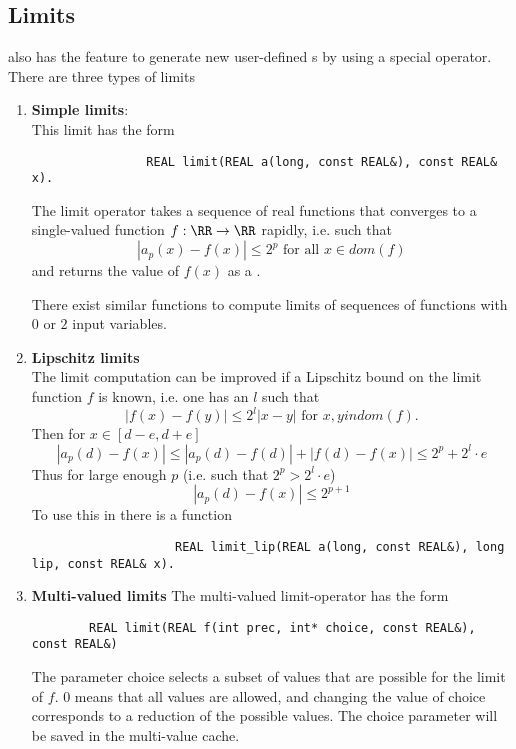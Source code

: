 	\subsection{Limits}
		\irram also has the feature to generate new user-defined {\real}s by using a special  operator.
		There are three types of limits
		\begin{enumerate}
			\item \textbf{Simple limits}: \\
			This limit has the form
			\begin{verbatim}
				REAL limit(REAL a(long, const REAL&), const REAL& x).
			\end{verbatim}

			The limit operator takes a sequence of real functions that converges to a single-valued function $f: \RR \to \RR$
			rapidly, i.e. such that 
			$$|a_p(x) - f(x)| \leq 2^p \text{ for all } x \in dom(f)$$
			and returns the value of $f(x)$ as a \real.

			There exist similar functions to compute limits of sequences of functions with $0$ or $2$ input variables.
			\item \textbf{Lipschitz limits} \\
				The limit computation can be improved if a Lipschitz bound on the limit function $f$ is known, i.e. one has an $l$
				such that
				\begin{equation*}
					| f(x) - f(y) | \leq 2^l | x - y | \text{ for } x,y in dom(f).
				\end{equation*}
				Then for $x \in [d-e, d+e]$  
				$$ | a_p(d) - f(x) | \leq | a_p(d) - f(d) | + | f(d) - f(x) |  \leq 2^p + 2^l \cdot e $$
				Thus for large enough $p$ (i.e. such that $2^p > 2^l \cdot e$)
				$$ | a_p(d) - f(x) | \leq  2^{p+1} $$
				To use this in \irram there is a function
				\begin{verbatim}
					REAL limit_lip(REAL a(long, const REAL&), long lip, const REAL& x).
				\end{verbatim}
			\item \textbf{Multi-valued limits}
      The multi-valued limit-operator has the form 
      \begin{verbatim}
        REAL limit(REAL f(int prec, int* choice, const REAL&), const REAL&)
      \end{verbatim}
      The parameter choice selects a subset of values that are possible for the
      limit of $f$. $0$ means that all values are allowed, and changing the
      value of choice corresponds to a reduction of the possible values.
      The choice parameter will be saved in the multi-value cache.
		\end{enumerate}
